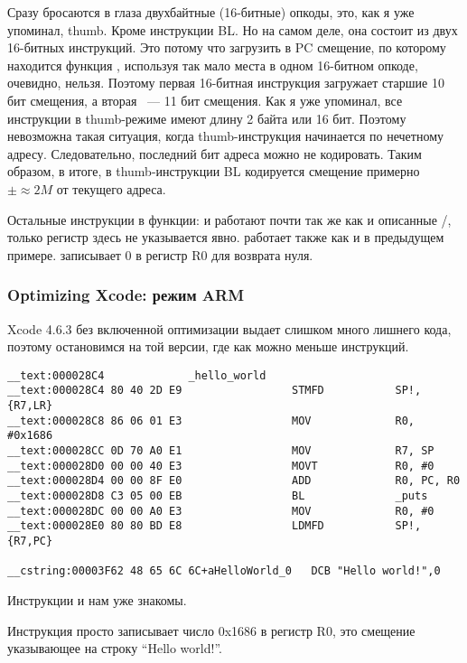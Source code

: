 Сразу бросаются в глаза двухбайтные (16-битные) опкоды, это, как я уже упоминал, thumb. Кроме инструкции BL.
Но на самом деле, она состоит из двух 16-битных инструкций. 
Это потому что загрузить в PC смещение, по которому
находится функция , используя так мало места в одном 16-битном опкоде, очевидно, нельзя.
Поэтому первая 16-битная инструкция загружает старшие 10 бит смещения, а вторая ~--- 11 бит смещения.
Как я уже упоминал, все инструкции в thumb-режиме имеют длину 2 байта или 16 бит. Поэтому невозможна такая
ситуация, когда thumb-инструкция начинается по нечетному адресу. 
Следовательно, последний бит адреса можно не кодировать.
Таким образом, в итоге, в thumb-инструкции BL кодируется смещение примерно $\pm{}\approx{}2M$ от текущего адреса.

Остальные инструкции в функции: \PUSH и \POP работают почти так же как и описанные /, только регистр  здесь не указывается явно.  работает также как и в предыдущем примере.  записывает 0 в регистр R0 для возврата нуля.

\subsubsection{Optimizing Xcode: режим ARM}

Xcode 4.6.3 без включенной оптимизации выдает слишком много лишнего кода, поэтому остановимся на той версии, где как можно меньше инструкций.

\begin{lstlisting}
__text:000028C4             _hello_world
__text:000028C4 80 40 2D E9                 STMFD           SP!, {R7,LR}
__text:000028C8 86 06 01 E3                 MOV             R0, #0x1686
__text:000028CC 0D 70 A0 E1                 MOV             R7, SP
__text:000028D0 00 00 40 E3                 MOVT            R0, #0
__text:000028D4 00 00 8F E0                 ADD             R0, PC, R0
__text:000028D8 C3 05 00 EB                 BL              _puts
__text:000028DC 00 00 A0 E3                 MOV             R0, #0
__text:000028E0 80 80 BD E8                 LDMFD           SP!, {R7,PC}

__cstring:00003F62 48 65 6C 6C+aHelloWorld_0   DCB "Hello world!",0
\end{lstlisting}

Инструкции  и  нам уже знакомы.

Инструкция  просто записывает число 0x1686 в регистр R0, это смещение указывающее на строку ``Hello world!''.

